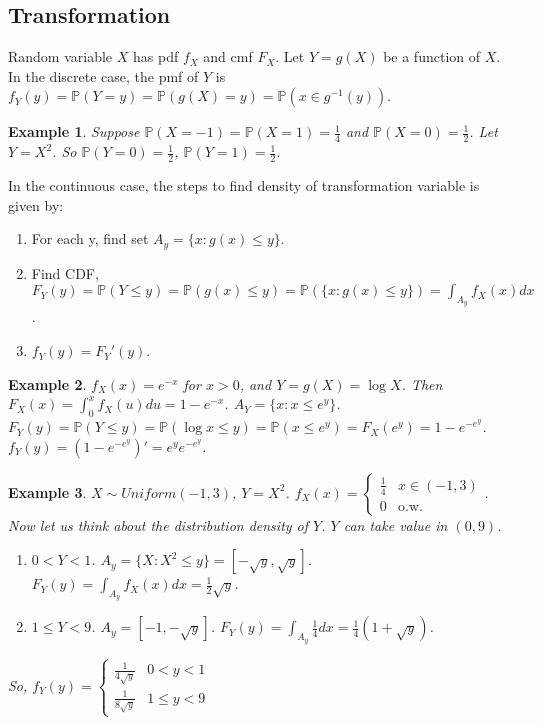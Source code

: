 \documentclass[11pt]{article}
\def\BP{{\bf P}}
\def\BP{{\mathbb P}}
\newtheorem{example}{Example}[section]
\begin{document}
\subsection{Transformation}
Random variable $X$ has pdf $f_X$ and cmf $F_X$. Let $Y = g(X)$ be a function of $X$. In the discrete case, the pmf of $Y$ is $f_Y(y) = \BP(Y = y) = \BP(g(X) = y) = \BP(x \in g^{-1}(y))$.

\begin{example}
Suppose $\BP(X=-1) = \BP(X=1) = \frac{1}{4}$ and $\BP(X=0) = \frac{1}{2}$. Let $Y=X^2$. So $\BP(Y=0) = \frac{1}{2}$, $\BP(Y=1)=\frac{1}{2}$.
\end{example}

In the continuous case, the steps to find density of transformation variable is given by:
\begin{enumerate}
\item For each y, find set $A_y = \{x:g(x) \leq y\}$.
\item Find CDF, $F_Y(y) = \BP(Y \leq y) = \BP(g(x) \leq y) = \BP(\{x: g(x)\leq y\}) = \int_{A_y} f_X(x) dx$.
\item $f_Y(y) = F_Y'(y)$.
\end{enumerate}

\begin{example}
  $f_X(x) = e^{-x}$ for $x>0$, and $Y=g(X)=\log X$. Then $F_X(x) = \int_0^x f_X(u) du = 1 - e^{-x}$. $A_Y = \{x: x \leq e^y\}$. $F_Y(y) = \BP(Y \leq y) = \BP(\log x \leq y) = \BP(x \leq e^y) = F_X(e^y) = 1 - e^{-e^y}$. $f_Y(y) = (1 - e^{-e^y})' = e^y e^{-e^y}$.
\end{example}

\begin{example}
  $X \sim Uniform(-1, 3)$, $Y=X^2$. $f_X(x) = \begin{cases}\frac{1}{4} & x\in(-1,3) \\ 0 & \text{o.w.}\end{cases}$. Now let us think about the distribution density of $Y$. $Y$ can take value in $(0, 9)$. 
  \begin{enumerate}
    \item $0 < Y < 1$. $A_y = \{X : X^2 \leq y\} = [-\sqrt{y}, \sqrt{y}]$. $F_Y(y) = \int_{A_y} f_X(x) dx = \frac{1}{2} \sqrt{y}$.
    \item $1 \leq Y < 9$. $A_y = [-1, -\sqrt{y}]$. $F_Y(y) = \int_{A_y} \frac{1}{4} dx = \frac{1}{4}(1 + \sqrt{y})$. 
  \end{enumerate}
  So, $f_Y(y) = \begin{cases} \frac{1}{4\sqrt{y}}  & 0 < y < 1 \\ \frac{1}{8\sqrt{y}}  & 1 \leq y < 9\end{cases}$
\end{example}
\end{document}
